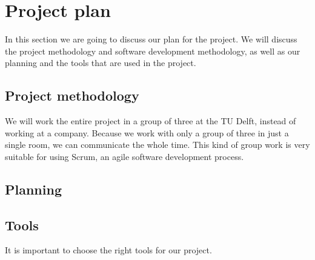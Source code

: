 \section{Project plan}
In this section we are going to discuss our plan for the project. 
We will discuss the project methodology and software development methodology,
as well as our planning and the tools that are used in the project.

\subsection{Project methodology}
We will work the entire project in a group of three at the TU Delft, instead of working at a company. 
Because we work with only a group of three in just a single room, we can communicate the whole time.
This kind of group work is very suitable for using Scrum, an agile software development process.

\subsection{Planning}

\subsection{Tools}
It is important to choose the right tools for our project. 
